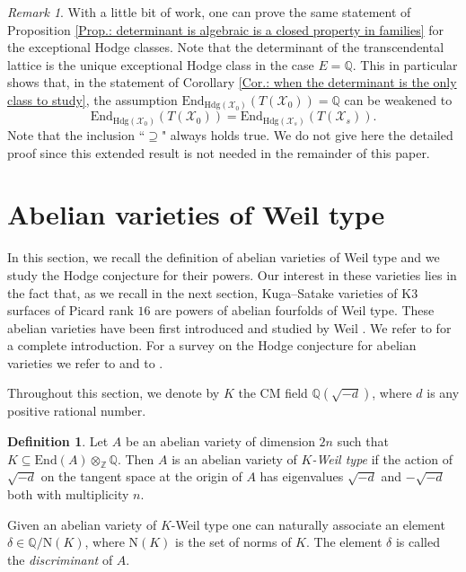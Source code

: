 \documentclass[11pt,twoside,a4paper]{amsart}
\newcommand{\0}{\mathscr{O}}
\newcommand{\Q}{\mathbb{Q}}
\newcommand{\X}{\mathscr{X}}
\theoremstyle{plain}
\theoremstyle{definition}
\newtheorem{defn}[thm]{Definition}
\theoremstyle{remark}
\newtheorem{rmk}[thm]{Remark}
\begin{document}
\begin{rmk}
With a little bit of work, one can prove the same statement of Proposition \ref{Prop.: determinant is algebraic is a closed property in families} for the exceptional Hodge classes. Note that the determinant of the transcendental lattice is the unique exceptional Hodge class in the case $E=\Q$.
This in particular shows that, in the statement of Corollary \ref{Cor.: when the determinant is the only class to study}, the assumption $\mathrm{End}_{\mathrm{Hdg}(\X_0)}(T(\X_0))=\Q$ can be weakened to 
\[\mathrm{End}_{\mathrm{Hdg}(\X_0)}(T(\X_0))=\mathrm{End}_{\mathrm{Hdg}(\X_s)}(T(\X_s)).\]
Note that the inclusion \textquotedblleft $\supseteq$" always holds true. We do not give here the detailed proof since this extended result is not needed in the remainder of this paper.
\end{rmk}


\section{Abelian varieties of Weil type}
\label{Sec. Ab. of Weil type}
In this section, we recall the definition of abelian varieties of Weil type and we study the Hodge conjecture for their powers. Our interest in these varieties lies in the fact that, as we recall in the next section, Kuga--Satake varieties of K3 surfaces of Picard rank $16$ are powers of abelian fourfolds of Weil type. These abelian varieties have been first introduced and studied by Weil \cite{weil}. We refer to \cite{van1994introduction} for a complete introduction. For a survey on the Hodge conjecture for abelian varieties we refer to \cite{moonen1995hodge} and to \cite{moonen1999hodge}.

\smallskip

Throughout this section, we denote by $K$ the CM field $\Q(\sqrt{-d})$, where $d$ is any positive rational number.

\begin{defn}
Let $A$ be an abelian variety of dimension $2n$ such that $K\subseteq \mathrm{End}(A)\otimes_\mathbb{Z}\Q$.
Then $A$ is an abelian variety of $K$\textit{-Weil type} if the action of $\sqrt{-d}$ on the tangent space at the origin of $A$ has eigenvalues $\sqrt{-d}$ and $-\sqrt{-d}$ both with multiplicity $n$.
\end{defn}

Given an abelian variety of $K$-Weil type one can naturally associate an element $\delta\in \Q/\mathrm{N}(K)$, where $\mathrm{N}(K)$ is the set of norms of $K$. The element $\delta$ is called the \textit{discriminant} of $A$.
\end{document}
